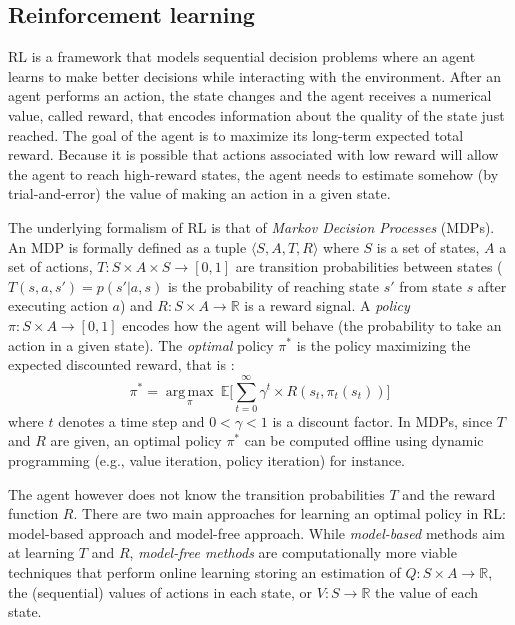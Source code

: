 \subsection{Reinforcement learning}

RL is a framework that models sequential decision
problems where an agent learns to make better decisions while interacting with
the environment. After an agent performs an action, the state changes and the
agent receives a numerical value, called reward, that encodes information
about the quality of the state just reached. The goal of the agent is to maximize
its long-term expected total reward. Because it is possible that actions associated 
with low reward will allow the agent to reach high-reward states, the agent
needs to estimate somehow (by trial-and-error) the value of making an action in
a given state.

The underlying formalism of RL is that of {\em Markov Decision Processes} (MDPs).
An MDP is formally defined as a tuple $\langle S, A, T, R \rangle$ where $S$ is a set of states, $A$ a set of actions, $T : S \times A \times S \rightarrow [0, 1]$ 
are transition probabilities between states
($T(s,a,s')=p(s'|a,s)$ is the probability of reaching state $s'$ from state $s$ after executing action $a$) and 
$R : S \times A \rightarrow \mathbb{R}$ is a reward signal. A \textit{policy} $\pi : S \times A \rightarrow [0, 1]$ encodes how the agent will behave (the probability
to take an action in a given state).
The {\em optimal} policy $\pi^*$ is the policy maximizing the expected discounted reward, that is :
\begin{equation}
\pi^* = \underset{\pi}{\operatorname{arg\,max}}\ \mathbb{E} \Big[ \sum\limits_{t=0}^{\infty} \gamma^t \times R(s_t, \pi_t(s_t)) \Big]
\end{equation}
where $t$ denotes a time step and $0 < \gamma < 1$ is a discount factor.
In MDPs, since $T$ and $R$ are given, an optimal policy $\pi^*$ can be computed offline using dynamic programming (e.g., value iteration, policy                                                                  
iteration) \cite{Howard1960} for instance.

The agent however does not know the transition probabilities $T$ and the reward function $R$.
There are two main approaches for learning an optimal policy in RL: model-based approach and model-free approach.
While {\em model-based} methods aim at learning $T$ and $R$,
{\em model-free methods} are computationally more viable techniques
that perform online learning storing an estimation of $Q : S \times A \rightarrow \mathbb{R}$, the (sequential) values of actions in each state,
or $V : S \rightarrow \mathbb{R}$ the value of each state.

